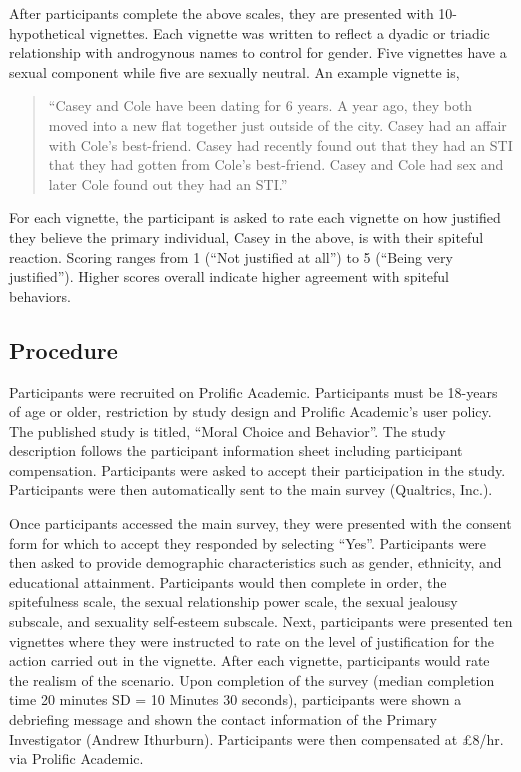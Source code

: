 \documentclass[
  donotrepeattitle,doc, 12pt, a4paper,floatsintext]{apa7}
\begin{document}
After participants complete the above scales, they are presented with 10-hypothetical vignettes. Each vignette was written to reflect a dyadic or triadic relationship with androgynous names to control for gender. Five vignettes have a sexual component while five are sexually neutral. An example vignette is,

\begin{quote}
``Casey and Cole have been dating for 6 years. A year ago, they both moved into a new flat together just outside of the city. Casey had an affair with Cole's best-friend. Casey had recently found out that they had an STI that they had gotten from Cole's best-friend. Casey and Cole had sex and later Cole found out they had an STI.''
\end{quote}

For each vignette, the participant is asked to rate each vignette on how justified they believe the primary individual, Casey in the above, is with their spiteful reaction. Scoring ranges from 1 (``Not justified at all'') to 5 (``Being very justified''). Higher scores overall indicate higher agreement with spiteful behaviors.

\hypertarget{procedure}{%
\subsection{Procedure}\label{procedure}}

Participants were recruited on Prolific Academic. Participants must be 18-years of age or older, restriction by study design and Prolific Academic's user policy. The published study is titled, ``Moral Choice and Behavior''. The study description follows the participant information sheet including participant compensation. Participants were asked to accept their participation in the study. Participants were then automatically sent to the main survey (Qualtrics, Inc.).

Once participants accessed the main survey, they were presented with the consent form for which to accept they responded by selecting ``Yes''. Participants were then asked to provide demographic characteristics such as gender, ethnicity, and educational attainment. Participants would then complete in order, the spitefulness scale, the sexual relationship power scale, the sexual jealousy subscale, and sexuality self-esteem subscale. Next, participants were presented ten vignettes where they were instructed to rate on the level of justification for the action carried out in the vignette. After each vignette, participants would rate the realism of the scenario. Upon completion of the survey (median completion time 20 minutes SD = 10 Minutes 30 seconds), participants were shown a debriefing message and shown the contact information of the Primary Investigator (Andrew Ithurburn). Participants were then compensated at £8/hr. via Prolific Academic.
\end{document}
